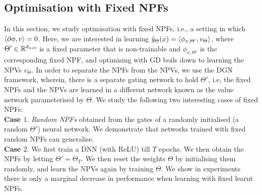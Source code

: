 \subsection{Optimisation with Fixed NPFs}
In this section, we study optimisation with fixed NPFs, i.e., a setting in which $\langle \partial \phi,v\rangle=0$. Here, we are interested in learning $\hat{y}_{\Theta}(x)=\langle \phi_{x,\Theta'}, v_{\Theta}\rangle$, where $\Theta'\in\mathbb{R}^{d_{net}}$ is a fixed parameter that is non-trainable and $\phi_{x,\Theta'}$ is the corresponding fixed NPF, and optimising with GD boils down to learning the NPVs $v_{\Theta}$. In order to separate the NPFs from the NPVs, we use the DGN framework, wherein, there is a separate gating network to hold $\Theta'$, i.e, the fixed NPFs and the NPVs are learned in a different network known as the value network parameterised by $\Theta$. We study the following two interesting cases of fixed NPFs:\\
\textbf{Case $1.$} \emph{Random NPFs} obtained from the gates of a randomly initialised (a random $\Theta'$) neural network. We demonstrate that networks trained with fixed random NPFs can generalise.\\
\textbf{Case $2.$} We first train a DNN (with ReLU) till $T$ epochs. We then obtain the NPFs by letting $\Theta'=\Theta_T$. We then reset the weights $\Theta$ by initialising them randomly, and learn the NPVs again by training $\Theta$. We show in experiments there is only a marginal decrease in performance when learning with fixed learnt NPFs.
\FloatBarrier
